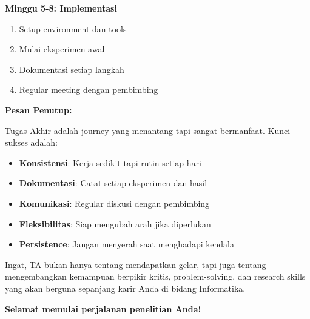 \textbf{Minggu 5-8: Implementasi}
\begin{enumerate}
    \item Setup environment dan tools
    \item Mulai eksperimen awal
    \item Dokumentasi setiap langkah
    \item Regular meeting dengan pembimbing
\end{enumerate}

\textbf{Pesan Penutup:}

Tugas Akhir adalah journey yang menantang tapi sangat bermanfaat. Kunci sukses adalah:
\begin{itemize}
    \item \textbf{Konsistensi}: Kerja sedikit tapi rutin setiap hari
    \item \textbf{Dokumentasi}: Catat setiap eksperimen dan hasil
    \item \textbf{Komunikasi}: Regular diskusi dengan pembimbing
    \item \textbf{Fleksibilitas}: Siap mengubah arah jika diperlukan
    \item \textbf{Persistence}: Jangan menyerah saat menghadapi kendala
\end{itemize}

Ingat, TA bukan hanya tentang mendapatkan gelar, tapi juga tentang mengembangkan kemampuan berpikir kritis, problem-solving, dan research skills yang akan berguna sepanjang karir Anda di bidang Informatika.

\textbf{Selamat memulai perjalanan penelitian Anda!}